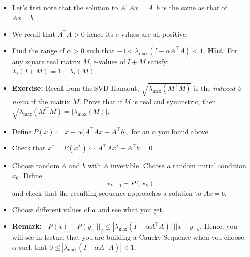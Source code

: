 \documentclass[letterpaper]{article}
\begin{document}
\begin{itemize}
\setlength{\itemsep}{.5cm}
\item  Let's first note that the solution to $A^\top A x = A^\top b$ is the same as that of $Ax=b$.

\item We recall that  $A^\top A >0$ hence its  e-values are all positive.

\item Find the range of $\alpha>0$ such that $-1 < \lambda_{\max}(I-\alpha A^\top A)<1$. \textbf{Hint}: For any square real matrix $M$, e-values of $I+M$ satisfy: $\lambda_i(I+M) = 1 + \lambda_i(M)$.

\item \textbf{Exercise:}  Recall from the SVD Handout, $\sqrt{\lambda_{\max}(M^\top M)  }$ is the \textit{induced 2-norm} of the matrix $M$. Prove that if $M$ is real and symmetric, then $\sqrt{\lambda_{\max}(M^\top M)  }=|  \lambda_{\max}(M)|$.

\item Define $P(x):=x-\alpha\big( A^\top A x - A^\top b \big),$ for an $\alpha$ you found above.

\item Check that $x^*=P(x^*) \Leftrightarrow A^\top A x^* - A^\top b =0$

\item Choose random $A$ and $b$ with $A$ invertible. Choose a random initial condition $x_0$. Define
$$ x_{k+1}=P(x_k)$$
and check that the resulting sequence approaches a solution to $Ax=b$.

\item Choose different values of $\alpha$ and see what you get.


\item \textbf{Remark:} $||P(x)-P(y)||_2 \le |\lambda_{\max}(I-\alpha A^\top A)| ~||x-y||_2$. Hence, you will see in lecture that you are building a Cauchy Sequence when you choose $\alpha$ such that $0 \le |\lambda_{\max}(I-\alpha A^\top A)| < 1$.

\end{itemize}
\end{document}
